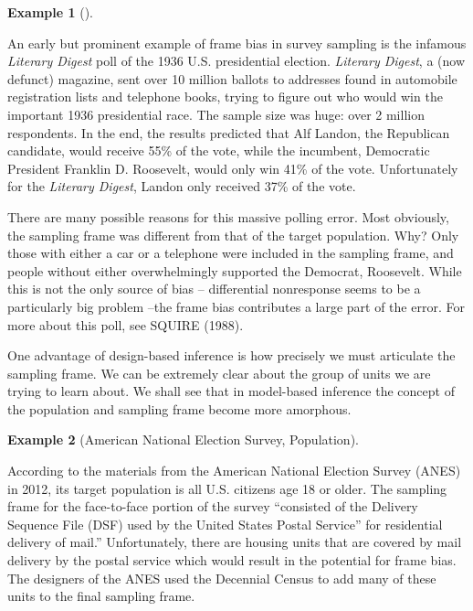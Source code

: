 \documentclass[
  13pt,
  letterpaper,
  DIV=11,
  numbers=noendperiod]{scrreprt}
\theoremstyle{plain}
\theoremstyle{plain}
\theoremstyle{definition}
\theoremstyle{definition}
\newtheorem{example}{Example}[chapter]
\theoremstyle{remark}
\begin{document}
\begin{example}[]\protect\hypertarget{exm-frame-bias}{}\label{exm-frame-bias}

An early but prominent example of frame bias in survey sampling is the
infamous \emph{Literary Digest} poll of the 1936 U.S. presidential
election. \emph{Literary Digest}, a (now defunct) magazine, sent over 10
million ballots to addresses found in automobile registration lists and
telephone books, trying to figure out who would win the important 1936
presidential race. The sample size was huge: over 2 million respondents.
In the end, the results predicted that Alf Landon, the Republican
candidate, would receive 55\% of the vote, while the incumbent,
Democratic President Franklin D. Roosevelt, would only win 41\% of the
vote. Unfortunately for the \emph{Literary Digest}, Landon only received
37\% of the vote.

There are many possible reasons for this massive polling error. Most
obviously, the sampling frame was different from that of the target
population. Why? Only those with either a car or a telephone were
included in the sampling frame, and people without either overwhelmingly
supported the Democrat, Roosevelt. While this is not the only source of
bias -- differential nonresponse seems to be a particularly big problem
--the frame bias contributes a large part of the error. For more about
this poll, see SQUIRE (1988).

\end{example}

One advantage of design-based inference is how precisely we must
articulate the sampling frame. We can be extremely clear about the group
of units we are trying to learn about. We shall see that in model-based
inference the concept of the population and sampling frame become more
amorphous.

\begin{example}[American National Election Survey,
Population]\protect\hypertarget{exm-anes-population}{}\label{exm-anes-population}

According to the materials from the American National Election Survey
(ANES) in 2012, its target population is all U.S. citizens age 18 or
older. The sampling frame for the face-to-face portion of the survey
``consisted of the Delivery Sequence File (DSF) used by the United
States Postal Service'' for residential delivery of mail.''
Unfortunately, there are housing units that are covered by mail delivery
by the postal service which would result in the potential for frame
bias. The designers of the ANES used the Decennial Census to add many of
these units to the final sampling frame.

\end{example}
\end{document}

